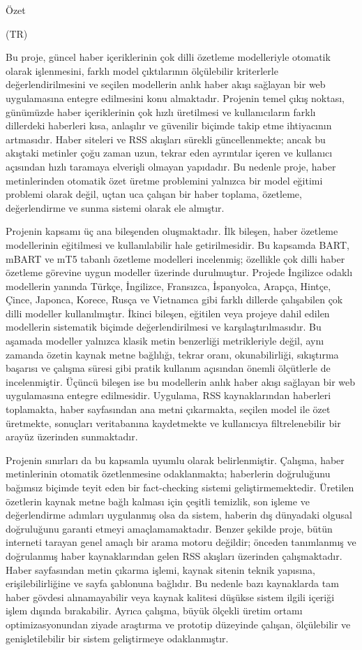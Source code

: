 Özet

(TR)


Bu proje, güncel haber içeriklerinin çok dilli özetleme modelleriyle otomatik olarak işlenmesini, farklı model çıktılarının ölçülebilir kriterlerle değerlendirilmesini ve seçilen modellerin anlık haber akışı sağlayan bir web uygulamasına entegre edilmesini konu almaktadır. Projenin temel çıkış noktası, günümüzde haber içeriklerinin çok hızlı üretilmesi ve kullanıcıların farklı dillerdeki haberleri kısa, anlaşılır ve güvenilir biçimde takip etme ihtiyacının artmasıdır. Haber siteleri ve RSS akışları sürekli güncellenmekte; ancak bu akıştaki metinler çoğu zaman uzun, tekrar eden ayrıntılar içeren ve kullanıcı açısından hızlı taramaya elverişli olmayan yapıdadır. Bu nedenle proje, haber metinlerinden otomatik özet üretme problemini yalnızca bir model eğitimi problemi olarak değil, uçtan uca çalışan bir haber toplama, özetleme, değerlendirme ve sunma sistemi olarak ele almıştır.

Projenin kapsamı üç ana bileşenden oluşmaktadır. İlk bileşen, haber özetleme modellerinin eğitilmesi ve kullanılabilir hale getirilmesidir. Bu kapsamda BART, mBART ve mT5 tabanlı özetleme modelleri incelenmiş; özellikle çok dilli haber özetleme görevine uygun modeller üzerinde durulmuştur. Projede İngilizce odaklı modellerin yanında Türkçe, İngilizce, Fransızca, İspanyolca, Arapça, Hintçe, Çince, Japonca, Korece, Rusça ve Vietnamca gibi farklı dillerde çalışabilen çok dilli modeller kullanılmıştır. İkinci bileşen, eğitilen veya projeye dahil edilen modellerin sistematik biçimde değerlendirilmesi ve karşılaştırılmasıdır. Bu aşamada modeller yalnızca klasik metin benzerliği metrikleriyle değil, aynı zamanda özetin kaynak metne bağlılığı, tekrar oranı, okunabilirliği, sıkıştırma başarısı ve çalışma süresi gibi pratik kullanım açısından önemli ölçütlerle de incelenmiştir. Üçüncü bileşen ise bu modellerin anlık haber akışı sağlayan bir web uygulamasına entegre edilmesidir. Uygulama, RSS kaynaklarından haberleri toplamakta, haber sayfasından ana metni çıkarmakta, seçilen model ile özet üretmekte, sonuçları veritabanına kaydetmekte ve kullanıcıya filtrelenebilir bir arayüz üzerinden sunmaktadır.

Projenin sınırları da bu kapsamla uyumlu olarak belirlenmiştir. Çalışma, haber metinlerinin otomatik özetlenmesine odaklanmakta; haberlerin doğruluğunu bağımsız biçimde teyit eden bir fact-checking sistemi geliştirmemektedir. Üretilen özetlerin kaynak metne bağlı kalması için çeşitli temizlik, son işleme ve değerlendirme adımları uygulanmış olsa da sistem, haberin dış dünyadaki olgusal doğruluğunu garanti etmeyi amaçlamamaktadır. Benzer şekilde proje, bütün interneti tarayan genel amaçlı bir arama motoru değildir; önceden tanımlanmış ve doğrulanmış haber kaynaklarından gelen RSS akışları üzerinden çalışmaktadır. Haber sayfasından metin çıkarma işlemi, kaynak sitenin teknik yapısına, erişilebilirliğine ve sayfa şablonuna bağlıdır. Bu nedenle bazı kaynaklarda tam haber gövdesi alınamayabilir veya kaynak kalitesi düşükse sistem ilgili içeriği işlem dışında bırakabilir. Ayrıca çalışma, büyük ölçekli üretim ortamı optimizasyonundan ziyade araştırma ve prototip düzeyinde çalışan, ölçülebilir ve genişletilebilir bir sistem geliştirmeye odaklanmıştır.

